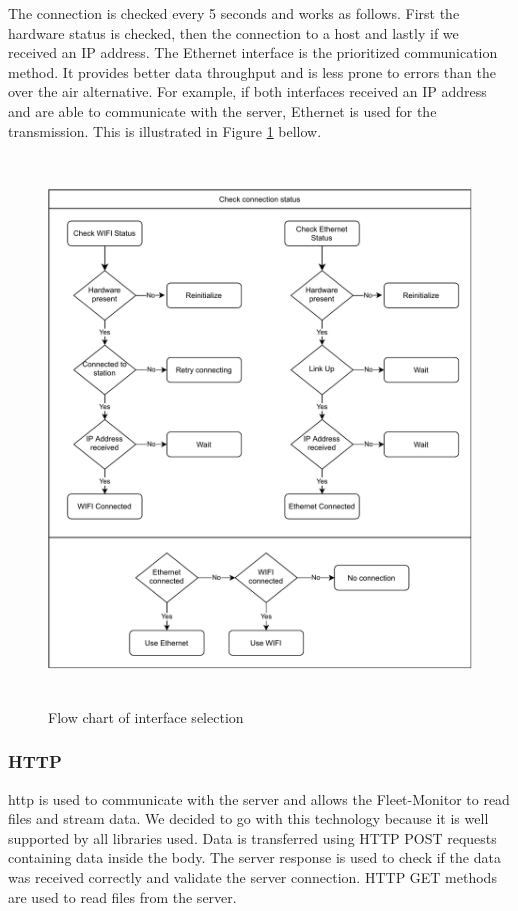The connection is checked every 5 seconds and works as follows. First the hardware status is checked, then the connection to a host and lastly if we received an IP address. The Ethernet interface is the prioritized communication method. It provides better data throughput and is less prone to errors than the over the air alternative. For example, if both interfaces received an IP address and are able to communicate with the server, Ethernet is used for the transmission. This is illustrated in Figure \ref{fig:connectin-tree} bellow.
\begin{figure}[!ht]
	\centering
	\includegraphics[height=14.5cm]{images/connection-tree}
	\caption{Flow chart of interface selection}
	\label{fig:connectin-tree}
\end{figure}
\newpage

\subsubsection{HTTP}
\acrfull{http} is used to communicate with the server and allows the Fleet-Monitor to read files and stream data. We decided to go with this technology because it is well supported by all libraries used. Data is transferred using HTTP POST requests containing data inside the body. The server response is used to check if the data was received correctly and validate the server connection. HTTP GET methods are used to read files from the server.

